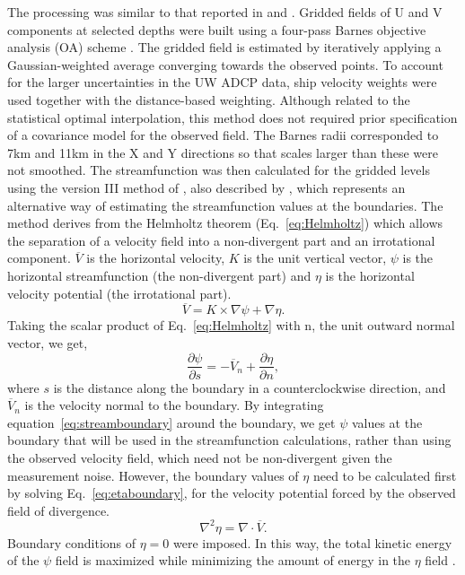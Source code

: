 The processing was similar to that reported in \citet{Barth00} and
\citet{Pierce00}. Gridded fields of U and V components at selected
depths were built using a four-pass Barnes objective analysis (OA)
scheme \citep{Barnes94,Koch83}.  The gridded field is estimated by
iteratively applying a Gaussian-weighted average converging
towards the observed points. To account for the larger
uncertainties in the UW ADCP data, ship velocity weights were used
together with the distance-based weighting.  Although related to
the statistical optimal interpolation, this method does not
required prior specification of a covariance model for the
observed field.  The Barnes radii corresponded to 7km and 11km in
the X and Y directions so that scales larger than these were not
smoothed. The streamfunction was then calculated for the gridded
levels using the version III method of \citet{Hawkins65}, also
described by \citet{Carter87}, which represents an alternative way
of estimating the streamfunction values at the boundaries. The
method derives from the Helmholtz theorem (Eq.~\ref{eq:Helmholtz})
which allows the separation of a velocity field into a
non-divergent part and an irrotational component. $\overline{V}$
is the horizontal velocity, $K$ is the unit vertical vector,
$\psi$ is the horizontal streamfunction (the non-divergent part)
and $\eta$ is the horizontal velocity potential (the irrotational
part).
\begin{equation}\label{eq:Helmholtz}
  \overline{V}=K\times\nabla\psi+\nabla\eta.
\end{equation}
Taking the scalar product of Eq.~\ref{eq:Helmholtz} with n, the
unit outward normal vector, we get,
\begin{equation}\label{eq:streamboundary}
  \frac{\partial\psi}{\partial
  s}=-\overline{V}_{n}+\frac{\partial\eta}{\partial n},
\end{equation}
where $s$ is the distance along the boundary in a counterclockwise
direction, and $\overline{V}_{n}$ is the velocity normal to the
boundary. By integrating equation~\ref{eq:streamboundary} around
the boundary, we get $\psi$ values at the boundary that will be
used in the streamfunction calculations, rather than using the
observed velocity field, which need not be non-divergent given the
measurement noise. However, the boundary values of $\eta$ need to
be calculated first by solving Eq.~\ref{eq:etaboundary}, for the
velocity potential forced by the observed field of divergence.
\begin{equation}\label{eq:etaboundary}
  \nabla^{2}\eta=\nabla\cdot\overline{V}.
\end{equation}
Boundary conditions of $\eta=0$ were imposed. In this way, the
total kinetic energy of the $\psi$ field is maximized while
minimizing the amount of energy in the $\eta$ field
\citep{Carter87}.

